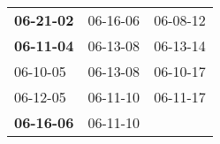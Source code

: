 \begin{supertabular}{p{0.33\columnwidth}p{0.33\columnwidth}p{0.33\columnwidth}}
 \textbf{06-21-02\textsuperscript{}} &  06-16-06\textsuperscript{} &  06-08-12\textsuperscript{} \\
 \textbf{06-11-04\textsuperscript{}} &  06-13-08\textsuperscript{} &  06-13-14\textsuperscript{} \\
          06-10-05\textsuperscript{} &  06-13-08\textsuperscript{} &  06-10-17\textsuperscript{} \\
          06-12-05\textsuperscript{} &  06-11-10\textsuperscript{} &  06-11-17\textsuperscript{} \\
 \textbf{06-16-06\textsuperscript{}} &  06-11-10\textsuperscript{} &                             \\
\end{supertabular}
